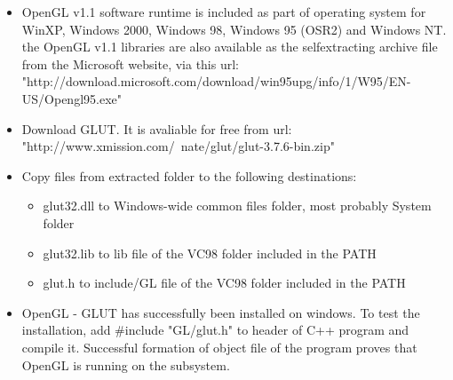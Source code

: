 

\usepackage[pdfauthor={Name}, pdftitle={Weekly}, pdfsubject={Week 1}, pdfkeywords={},colorlinks=true,urlcolor=black,linkcolor=black, citecolor=black]{hyperref}
\usepackage{listings}
\usepackage{subfig}




\renewcommand{\labelitemi}{\textcolor{main}{\small $\blacktriangleright$}}
\renewcommand{\labelitemii}{\textcolor{second}{\scriptsize \textbullet}}


\begin{enbref}
\begin{itemize}

\item OpenGL v1.1 software runtime is included as part of operating system for WinXP, Windows 2000, Windows 98, Windows 95 (OSR2) and Windows NT. the OpenGL v1.1 libraries are also available as the selfextracting archive file from the Microsoft website, via this url: "http://download.microsoft.com/download/win95upg/info/1/W95/EN-US/Opengl95.exe"
\item Download GLUT. It is avaliable for free from url:
"http://www.xmission.com/~nate/glut/glut-3.7.6-bin.zip"
\item Copy files from extracted folder to the following destinations:
\begin{itemize}
\item glut32.dll to Windows-wide common files folder, most probably System folder
\item glut32.lib to lib file of the VC98 folder included in the PATH
\item glut.h to include/GL file of the VC98 folder included in the PATH
\end{itemize}
\item OpenGL - GLUT has successfully been installed on windows. To test the installation, add \#include "GL/glut.h" to header of C++ program and compile it. Successful formation of object file of the program proves that OpenGL is running on the subsystem.
\end{itemize}
\medskip



\end{enbref}
